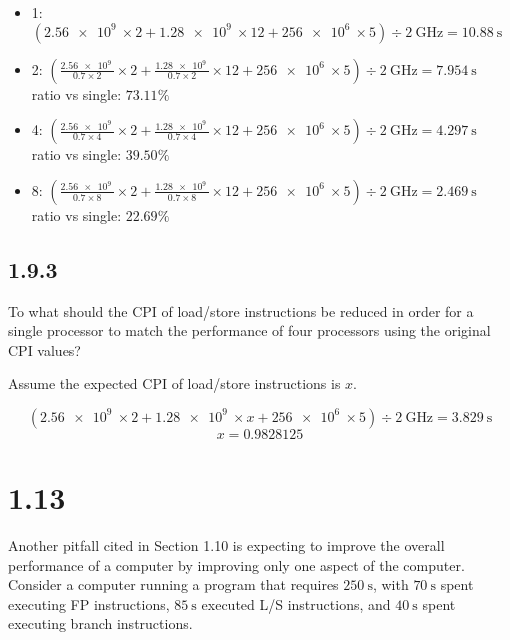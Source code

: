 \documentclass[paper=a4, fontsize=11pt]{scrartcl} %
\begin{document}
\begin{itemize}
\item{1:} $(\SI{2.56e9}{}\times 2 + \SI{1.28e9}{}\times 12 +
  \SI{256e6}{}\times 5) \div \SI{2}{\giga\hertz} = \SI{10.88}{\second}$
\item{2:} $(\frac{\SI{2.56e9}{}}{0.7\times 2}\times 2 +
  \frac{\SI{1.28e9}{}}{0.7\times 2}\times 12 + \SI{256e6}{}\times 5)
  \div \SI{2}{\giga\hertz} = \SI{7.954}{\second}$\\
  ratio vs single: $73.11\%$
\item{4:} $(\frac{\SI{2.56e9}{}}{0.7\times 4}\times 2 +
  \frac{\SI{1.28e9}{}}{0.7\times 4}\times 12 + \SI{256e6}{}\times 5)
  \div \SI{2}{\giga\hertz} = \SI{4.297}{\second}$\\
  ratio vs single: $39.50\%$
\item{8:} $(\frac{\SI{2.56e9}{}}{0.7\times 8}\times 2 +
  \frac{\SI{1.28e9}{}}{0.7\times 8}\times 12 + \SI{256e6}{}\times 5)
  \div \SI{2}{\giga\hertz} = \SI{2.469}{\second}$\\
  ratio vs single: $22.69\%$
\end{itemize}

\subsection{1.9.3}
\begin{fancyquotes}
  To what should the CPI of load/store instructions be reduced in
  order for a single processor to match the performance of four
  processors using the original CPI values?
\end{fancyquotes}

Assume the expected CPI of load/store instructions is $x$.

$$(\SI{2.56e9}{}\times 2 + \SI{1.28e9}{}\times x +
\SI{256e6}{}\times 5)
\div \SI{2}{\giga\hertz}
= \SI{3.829}{\second}$$
$$x = 0.9828125$$

\pagebreak

\section{1.13}

\begin{fancyquotes}
  Another pitfall cited in Section 1.10 is expecting to improve the
  overall performance of a computer by improving only one aspect of
  the computer. Consider a computer running a program that requires
  $\SI{250}{\second}$, with $\SI{70}{\second}$ spent executing FP
  instructions, $\SI{85}{\second}$ executed L/S instructions, and
  $\SI{40}{\second}$ spent executing branch instructions.
\end{fancyquotes}
\end{document}
